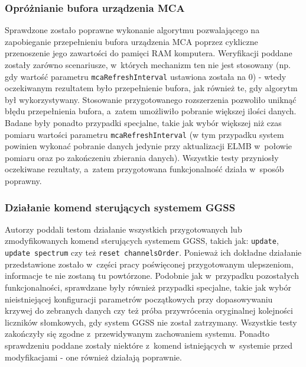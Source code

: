 

\subsubsection*{Opróżnianie bufora urządzenia MCA}
Sprawdzone zostało poprawne wykonanie algorytmu pozwalającego na zapobieganie przepełnieniu bufora urządzenia MCA poprzez cykliczne przenoszenie jego zawartości do pamięci RAM komputera. Weryfikacji poddane zostały zarówno scenariusze, w~których mechanizm ten nie jest stosowany (np. gdy wartość parametru \lstinline{mcaRefreshInterval} ustawiona została na 0) - wtedy oczekiwanym rezultatem było przepełnienie bufora, jak również te, gdy algorytm był wykorzystywany. Stosowanie przygotowanego rozszerzenia pozwoliło uniknąć błędu przepełnienia bufora, a~zatem umożliwiło pobranie większej ilości danych. Badane były ponadto przypadki specjalne, takie jak wybór większej niż czas pomiaru wartości parametru \lstinline{mcaRefreshInterval} (w tym przypadku system powinien wykonać pobranie danych jedynie przy aktualizacji ELMB w~połowie pomiaru oraz po zakończeniu zbierania danych). Wszystkie testy przyniosły oczekiwane rezultaty, a~zatem przygotowana funkcjonalność działa w~sposób poprawny.

\subsubsection*{Działanie komend sterujących systemem GGSS}
Autorzy poddali testom działanie wszystkich przygotowanych lub zmodyfikowanych komend sterujących systemem GGSS, takich jak: \lstinline{update}, \lstinline{update spectrum} czy też \lstinline{reset channelsOrder}. Ponieważ ich dokładne działanie przedstawione zostało w~części pracy poświęconej przygotowanym ulepszeniom, informacje te nie zostaną tu powtórzone. Podobnie jak w~przypadku pozostałych funkcjonalności, sprawdzane były również przypadki specjalne, takie jak wybór nieistniejącej konfiguracji parametrów początkowych przy dopasowywaniu krzywej do zebranych danych czy też próba przywrócenia oryginalnej kolejności liczników słomkowych, gdy system GGSS nie został zatrzymany. Wszystkie testy zakończyły się zgodne z~przewidywanym zachowaniem systemu. Ponadto sprawdzeniu poddane zostały niektóre z~komend istniejących w~systemie przed modyfikacjami - one również działają poprawnie.

